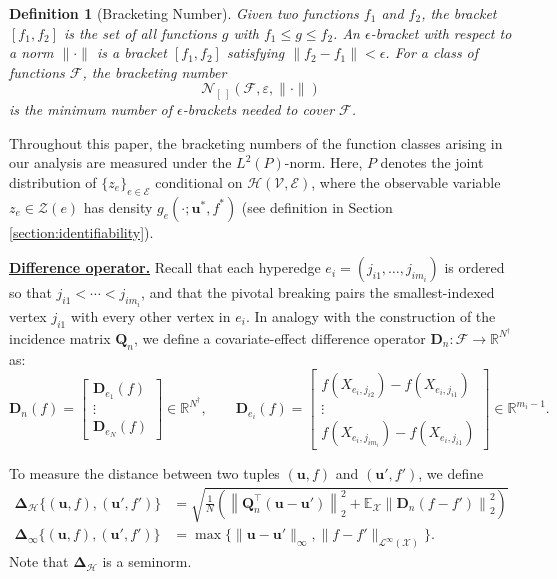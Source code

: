 \documentclass[
  12pt]{article}
\newtheorem{definition}{Definition}
\begin{document}
\begin{definition}[Bracketing Number]\label{def:bracketing}
Given two functions $f_1$ and $f_2$, the bracket $[f_1, f_2]$ is the set of
all functions $g$ with $f_1\leq g\leq f_2$.  An \emph{$\epsilon$-bracket}
with respect to a norm $\|\cdot\|$ is a bracket $[f_1, f_2]$ satisfying
$\|f_2-f_1\|<\epsilon$.  For a
class of functions $\mathcal{F}$, the bracketing number
$$\mathcal{N}_{[\ ]}(\mathcal{F},\varepsilon,\|\cdot\|)$$ 
is the minimum
number of $\epsilon$-brackets needed to cover $\mathcal{F}$.
\end{definition}

Throughout this paper, the bracketing numbers of the function classes arising in our
analysis are measured under the $L^2(P)$-norm. Here, $P$ denotes the joint distribution of
$\{z_e\}_{e \in \mathcal{E}}$ conditional on
$\mathcal{H}(\mathcal{V}, \mathcal{E})$, where the observable variable $z_e \in \mathcal{Z}(e)$ has density $g_e(\cdot;\boldsymbol{u}^*, f^*)$ (see definition in Section \ref{section:identifiability}).

\underline{\bf Difference operator.}
Recall that each hyperedge $e_i = (j_{i1},\ldots,j_{im_i})$ is ordered so that $j_{i1}<\cdots<j_{im_i}$, and that the pivotal breaking pairs the smallest-indexed vertex $j_{i1}$ with every other vertex in $e_i$. In analogy with the construction of the incidence matrix $\boldsymbol{Q}_n$, we define a covariate-effect difference operator $\boldsymbol{D}_n:\mathcal{F}\to\mathbb{R}^{N^\dagger}$ as:
$$
{\boldsymbol{D}_n(f)
=\begin{bmatrix}
\boldsymbol{D}_{e_1}(f)\\
\vdots\\
\boldsymbol{D}_{e_N}(f)
\end{bmatrix}\in\mathbb{R}^{N^\dagger},
\qquad
\boldsymbol{D}_{e_i}(f)
=\begin{bmatrix}
f(X_{e_i,j_{i2}})-f(X_{e_i,j_{i1}})\\
\vdots\\
f(X_{e_i,j_{im_i}})-f(X_{e_i,j_{i1}})
\end{bmatrix}\in\mathbb{R}^{m_i-1}.}
$$

\noindent To measure the distance between two tuples $(\boldsymbol{u},f)$ and $(\boldsymbol{u}',f')$, we define
$$\begin{aligned}
\mathbf{\Delta}_{\mathcal{H}}\{(\boldsymbol{u},f),(\boldsymbol{u}',f')\}&= \sqrt{\frac{1}{N}\left(\left\|\boldsymbol{Q}_n^{\top}\left(\boldsymbol{u}-\boldsymbol{u}'\right)\right\|_2^2+\mathbb{E}_{\mathcal{X}}\left\|\boldsymbol{D}_n\left(f-f'\right)\right\|_2^2\right)}\\
\mathbf{\Delta}_\infty\{(\boldsymbol{u},f),(\boldsymbol{u}',f')\}&=\max\{ \| \boldsymbol{u}- \boldsymbol{u}'\|_\infty, \| f-f' \|_{\mathcal{L}^\infty(\mathcal{X})} \}.
\end{aligned}$$
Note that $\mathbf{\Delta}_{\mathcal{H}}$ is a seminorm.
\end{document}
